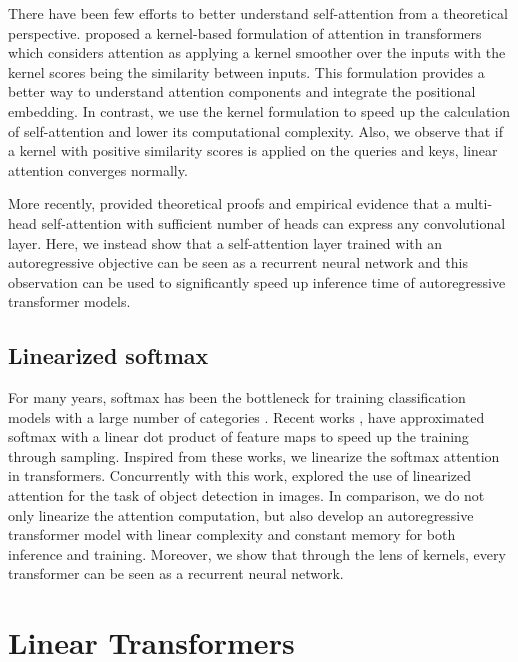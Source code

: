 There have been few efforts to better understand self-attention from a theoretical perspective. \citet{tsai2019transformer} proposed a kernel-based formulation of attention in transformers which considers attention as applying a kernel smoother over the inputs with the kernel scores being the similarity between inputs. This formulation provides a better way to understand attention components and integrate the positional embedding. In contrast, we use the kernel formulation to speed up the calculation of self-attention and lower its computational complexity. Also, we observe that if a kernel with positive similarity scores is applied on the queries and keys, linear attention converges normally.

More recently, \citet{Cordonnier2020On} provided theoretical proofs and empirical evidence that a multi-head self-attention with sufficient number of heads can express any convolutional layer. Here, we instead show that a self-attention layer trained with an autoregressive objective can be seen as a recurrent neural network and this observation can be used to significantly speed up inference time of autoregressive transformer models.

\subsection{Linearized softmax}

For many years, softmax has been the bottleneck for training classification models with a large number of categories \cite{goodman2001classes,
morin2005hierarchical, mnih2009scalable}. Recent works \cite{blanc2017adaptive,
rawat2019sampled}, have approximated softmax with a linear dot product of feature maps to speed up the training through sampling. Inspired from these works, we linearize the softmax attention in transformers. Concurrently with this work, \citet{shen2020efficient} explored the use of linearized attention for the task of object detection in images. In comparison, we do not only linearize the attention computation, but also develop an autoregressive transformer model with linear complexity and constant memory for both inference and training. Moreover, we show that through the lens of kernels, every transformer can be seen as a recurrent neural network.

\section{Linear Transformers}

